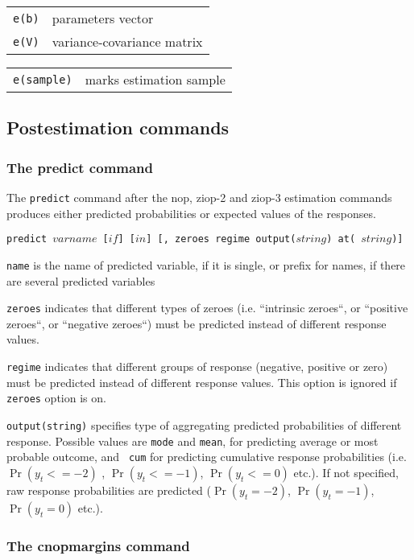 \documentclass[letterpaper,fleqn,12pt]{article}
\begin{document}
\begin{onehalfspace}

\begin{tabular}{p{3cm}p{12cm}}
\texttt{e(b)} & parameters vector \\ 
\texttt{e(V)} & variance-covariance matrix%
\end{tabular}


\begin{tabular}{p{3cm}p{12cm}}
\texttt{e(sample)} & marks estimation sample%
\end{tabular}

\subsection{Postestimation commands}

\subsubsection*{The predict command}

The \texttt{predict} command after the nop, ziop-2 and ziop-3 estimation
commands produces either predicted probabilities or expected values of the
responses.

\texttt{predict $varname$ [$if$] [$in$] [, zeroes regime output($string$) at(%
$string$)]}

\texttt{name} is the name of predicted variable, if it is single, or prefix
for names, if there are several predicted variables

\texttt{zeroes} indicates that different types of zeroes (i.e. ``intrinsic
zeroes``, or ``positive zeroes``, or ``negative zeroes``) must be predicted
instead of different response values.

\texttt{regime} indicates that different groups of response (negative,
positive or zero) must be predicted instead of different response values.
This option is ignored if \texttt{zeroes} option is on.

\texttt{output(string)} specifies type of aggregating predicted
probabilities of different response. Possible values are \texttt{mode} and 
\texttt{mean}, for predicting average or most probable outcome, and \texttt{%
cum} for predicting cumulative response probabilities (i.e. $\Pr (y_{t}<=-2)$%
, $\Pr (y_{t}<=-1)$, $\Pr (y_{t}<=0)$ etc.). If not specified, raw response
probabilities are predicted ($\Pr (y_{t}=-2)$, $\Pr (y_{t}=-1)$, $\Pr
(y_{t}=0)$ etc.).

\subsubsection*{The cnopmargins command}


\end{onehalfspace}
\end{document}
